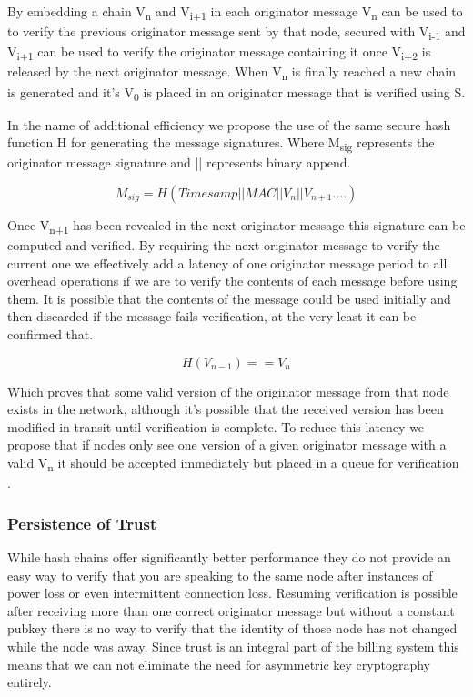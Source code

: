 \documentclass[11pt]{article}
\begin{document}
               By embedding a chain V\textsubscript{n} and V\textsubscript{i+1} in each originator message V\textsubscript{n} can be used to to verify the previous originator message sent by that node, secured with V\textsubscript{i-1} and V\textsubscript{i+1} can be used to verify the originator message containing it once V\textsubscript{i+2} is released by the next originator message. When V\textsubscript{n} is finally reached a new chain is generated and it's V\textsubscript{0} is placed in an originator message that is verified using S.      
               
               
               In the name of additional efficiency we propose the use of the same secure hash function H for generating the message signatures. Where M\textsubscript{sig} represents the originator message signature and || represents binary append.
               
               \[M_{sig} = H(Timesamp||MAC||V_n||V_{n+1}....)\]
               
               Once V\textsubscript{n+1} has been revealed in the next originator message this signature can be computed and verified. By requiring the next originator message to verify the current one we effectively add a latency of one originator message period to all overhead operations if we are to verify the contents of each message before using them. It is possible that the contents of the message could be used initially and then discarded if the message fails verification, at the very least it can be confirmed that.
                     
                     \[H(V_{n-1}) == V_n\]
                     
               Which proves that some valid version of the originator message from that node exists in the network, although it's possible that the received version has been modified in transit until verification is complete. To reduce this latency we propose that if nodes only see one version of a given originator message with a valid V\textsubscript{n} it should be accepted immediately but placed in a queue for verification \cite{spins,hash}.
               
               \subsubsection{Persistence of Trust}
               
                      While hash chains offer significantly better performance they do not provide an easy way to verify that you are speaking to the same node after instances of power loss or even intermittent connection loss. Resuming verification is possible after receiving more than one correct originator message but without a constant pubkey there is no way to verify that the identity of those node has not changed while the node was away. Since trust is an integral part of the billing system this means that we can not eliminate the need for asymmetric key cryptography entirely. 
                      
\end{document}
